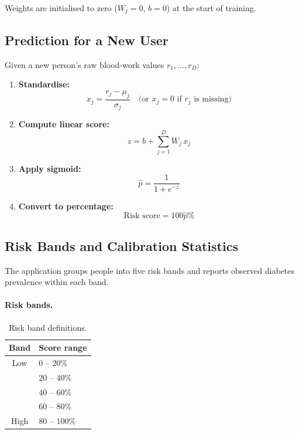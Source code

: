 Weights are initialised to zero ($W_j = 0$, $b = 0$) at the start of training.

\subsection{Prediction for a New User}

Given a new person's raw blood-work values $r_1, \ldots, r_D$:

\begin{enumerate}
    \item \textbf{Standardise:}
    \begin{equation}
        x_j = \frac{r_j - \mu_j}{\sigma_j} \quad \text{(or } x_j = 0 \text{ if } r_j \text{ is missing)}
    \end{equation}

    \item \textbf{Compute linear score:}
    \begin{equation}
        z = b + \sum_{j=1}^{D} W_j \, x_j
    \end{equation}

    \item \textbf{Apply sigmoid:}
    \begin{equation}
        \hat{p} = \frac{1}{1 + e^{-z}}
    \end{equation}

    \item \textbf{Convert to percentage:}
    \begin{equation}
        \text{Risk score} = 100\hat{p}\%
    \end{equation}
\end{enumerate}

\subsection{Risk Bands and Calibration Statistics}

The application groups people into five risk bands and reports observed diabetes prevalence within each band.

\paragraph{Risk bands.}
\begin{table}[h]
\centering
\begin{tabular}{cl}
\hline
\textbf{Band} & \textbf{Score range} \\
\hline
Low & $0$ -- $20\%$ \\
& $20$ -- $40\%$ \\
& $40$ -- $60\%$ \\
& $60$ -- $80\%$ \\
High & $80$ -- $100\%$ \\
\hline
\end{tabular}
\caption{Risk band definitions.}
\end{table}

